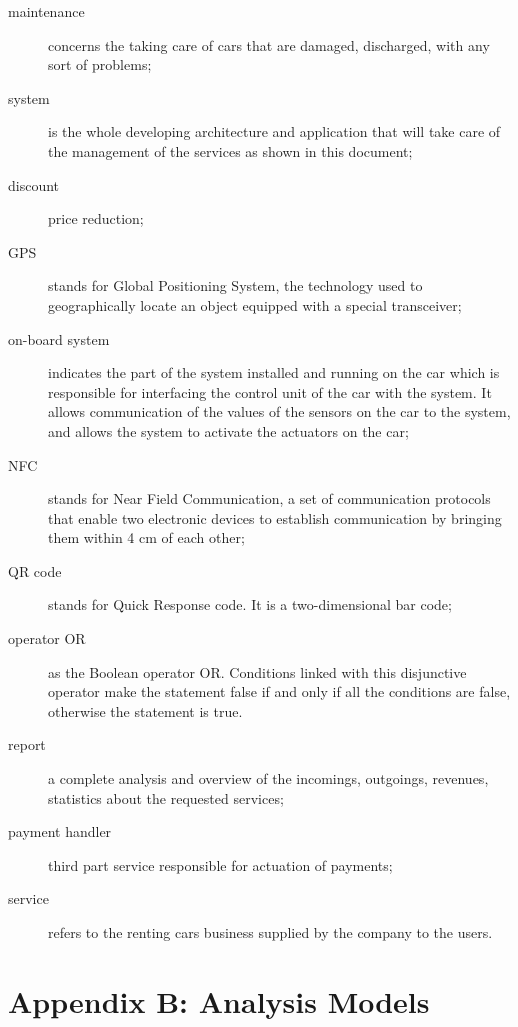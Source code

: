 \documentclass{scrreprt}
\begin{document}
\begin{description}
\item [maintenance] concerns the taking care of cars that are damaged, discharged, with any sort of problems;
\item [system] is the whole developing architecture and application that will take care of the management of the services as shown in this document;
\item [discount] price reduction;
\item [GPS] stands for Global Positioning System, the technology used to geographically locate an object equipped with a special transceiver;
\item [on-board system] indicates the part of the system installed and running on the car which is responsible for interfacing the control unit of the car with the system. It allows communication of the values of the sensors on the car to the system, and allows the system to activate the actuators on the car;
\item [NFC] stands for Near Field Communication, a set of communication protocols that enable two electronic devices to establish communication by bringing them within 4 cm of each other;
\item [QR code] stands for Quick Response code. It is a two-dimensional bar code;
\item [operator OR] as the Boolean operator OR. Conditions linked with this disjunctive operator make the statement false if and only if all the conditions are false, otherwise the statement is true.
\item [report] a complete analysis and overview of the incomings, outgoings, revenues, statistics about the requested services;
\item [payment handler] third part service responsible for actuation of payments;
\item [service] refers to the renting cars business supplied by the company to the users.
\end{description}

\begin{comment}$<$Define all the terms necessary to properly interpret the SRS, including 
acronyms and abbreviations. You may wish to build a separate glossary that spans 
multiple projects or the entire organization, and just include terms specific to 
a single project in each SRS.$>$
\end{comment}

\section{Appendix B: Analysis Models}
\end{document}
